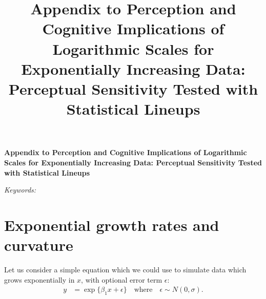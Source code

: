 \documentclass[12pt]{article}
\newcommand{\blind}{}
\begin{document}
\def\spacingset#1{\renewcommand{\baselinestretch}%
{#1}\small\normalsize} \spacingset{1}



\blind
{
  \title{\bf Appendix to Perception and Cognitive Implications of
Logarithmic Scales for Exponentially Increasing Data: Perceptual
Sensitivity Tested with Statistical Lineups}

  \author{
      }
  \maketitle
} \fi

\blind
{
  \bigskip
  \bigskip
  \bigskip
  \begin{center}
    {\LARGE\bf Appendix to Perception and Cognitive Implications of
Logarithmic Scales for Exponentially Increasing Data: Perceptual
Sensitivity Tested with Statistical Lineups}
  \end{center}
  \medskip
} \fi

\bigskip
\begin{abstract}

\end{abstract}

\noindent%
{\it Keywords:} 
\vfill

\newpage
\spacingset{1.45} %

\renewcommand{\thesection}{A}
\setcounter{figure}{0}    
\renewcommand\thefigure{\thesection\arabic{figure}}  
\setcounter{equation}{0}    
\renewcommand\theequation{\thesection\arabic{equation}}

\hypertarget{exponential-growth-rates-and-curvature}{%
\section{Exponential growth rates and
curvature}\label{exponential-growth-rates-and-curvature}}

Let us consider a simple equation which we could use to simulate data
which grows exponentially in \(x\), with optional error term
\(\epsilon\):
\begin{align}y &= \exp\{\beta_1 x + \epsilon\}\quad \text{where}\quad \epsilon \sim N(0, \sigma).\label{eq:simpleexp}\end{align}
\end{document}

